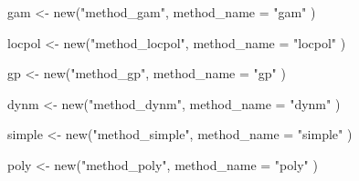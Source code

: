 gam <- new("method_gam",
  method_name = "gam"
)

locpol <- new("method_locpol",
  method_name = "locpol"
)

gp <- new("method_gp",
  method_name = "gp"
)

dynm <- new("method_dynm",
  method_name = "dynm"
)

simple <- new("method_simple",
  method_name = "simple"
)

poly <- new("method_poly",
  method_name = "poly"
)